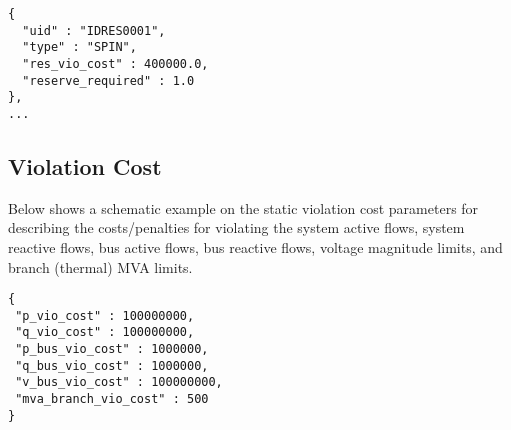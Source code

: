 \begin{verbatim}
{
  "uid" : "IDRES0001",
  "type" : "SPIN",
  "res_vio_cost" : 400000.0,
  "reserve_required" : 1.0
},
...
\end{verbatim}


\subsection{Violation Cost}
\label{sec:violation}

Below shows a schematic example on the static violation cost parameters for 
describing the costs/penalties for violating the system active flows, system reactive flows,
bus active flows, bus reactive flows, 
voltage magnitude limits, 
and branch (thermal) MVA limits. 

\begin{verbatim}
{
 "p_vio_cost" : 100000000,
 "q_vio_cost" : 100000000,
 "p_bus_vio_cost" : 1000000,
 "q_bus_vio_cost" : 1000000,
 "v_bus_vio_cost" : 100000000,
 "mva_branch_vio_cost" : 500
}
\end{verbatim}





\endinput 









\subsection{Substation}
\label{sec:substation}
A \emph{substation} is a collection of equipment located at a the same physical site and belonging to one Transmission System Operator (TSO). 
It is usually composed of different voltage levels with transformers.
Substation objects are required to have: 
\begin{itemize}
    \item A \texttt{"uid"} object\\
    The value of the object must be a unique ID (string) identifying the component.    
    \item A \texttt{"buses"} object\\
    The value of the object is an array identifying the unique IDs of the buses located within the substation.    
\end{itemize}
Network example:
\begin{verbatim}
{
  "uid" : "IDSUB0001",
  "buses" : ["IDB0001", "IDB0002", "IDB0010"],
},
…    
\end{verbatim}


